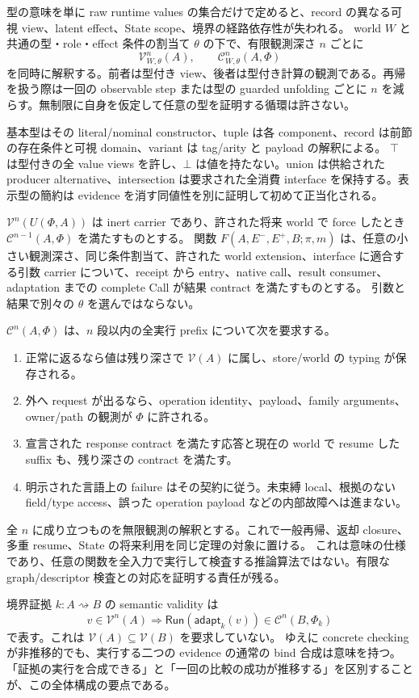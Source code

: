 \documentclass[11pt,a4paper]{article}
\theoremstyle{remark}
\newcommand{\Run}{\mathsf{Run}}
\newcommand{\adap}{\rightsquigarrow}
\begin{document}
型の意味を単に raw runtime values の集合だけで定めると、record の異なる可視 view、latent effect、State scope、境界の経路依存性が失われる。
world $W$ と共通の型・role・effect 条件の割当て $\theta$ の下で、有限観測深さ $n$ ごとに
\[
\mathcal V^n_{W,\theta}(A),\qquad
\mathcal C^n_{W,\theta}(A,\Phi)
\]
を同時に解釈する。前者は型付き view、後者は型付き計算の観測である。再帰を扱う際は一回の observable step または型の guarded unfolding ごとに $n$ を減らす。無制限に自身を仮定して任意の型を証明する循環は許さない。

基本型はその literal/nominal constructor、tuple は各 component、record は前節の存在条件と可視 domain、variant は tag/arity と payload の解釈による。
$\top$ は型付きの全 value views を許し、$\bot$ は値を持たない。union は供給された producer alternative、intersection は要求された全消費 interface を保持する。表示型の簡約は evidence を消す同値性を別に証明して初めて正当化される。

$\mathcal V^n(U(\Phi,A))$ は inert carrier であり、許された将来 world で force したとき $\mathcal C^{n-1}(A,\Phi)$ を満たすものとする。
関数 $F(A,E^-,E^+,B;\pi,m)$ は、任意の小さい観測深さ、同じ条件割当て、許された world extension、interface に適合する引数 carrier について、receipt から entry、native call、result consumer、adaptation までの complete Call が結果 contract を満たすものとする。
引数と結果で別々の $\theta$ を選んではならない。

$\mathcal C^n(A,\Phi)$ は、$n$ 段以内の全実行 prefix について次を要求する。
\begin{enumerate}
\item 正常に返るなら値は残り深さで $\mathcal V(A)$ に属し、store/world の typing が保存される。
\item 外へ request が出るなら、operation identity、payload、family arguments、owner/path の観測が $\Phi$ に許される。
\item 宣言された response contract を満たす応答と現在の world で resume した suffix も、残り深さの contract を満たす。
\item 明示された言語上の failure はその契約に従う。未束縛 local、根拠のない field/type access、誤った operation payload などの内部故障へは進まない。
\end{enumerate}
全 $n$ に成り立つものを無限観測の解釈とする。これで一般再帰、返却 closure、多重 resume、State の将来利用を同じ定理の対象に置ける。
これは意味の仕様であり、任意の関数を全入力で実行して検査する推論算法ではない。有限な graph/descriptor 検査との対応を証明する責任が残る。

境界証拠 $k:A\adap B$ の semantic validity は
\[
v\in\mathcal V^n(A)\Longrightarrow
\Run(\mathsf{adapt}_k(v))\in\mathcal C^n(B,\Phi_k)
\]
で表す。これは $\mathcal V(A)\subseteq\mathcal V(B)$ を要求していない。
ゆえに concrete checking が非推移的でも、実行する二つの evidence の通常の bind 合成は意味を持つ。
「証拠の実行を合成できる」と「一回の比較の成功が推移する」を区別することが、この全体構成の要点である。
\end{document}
